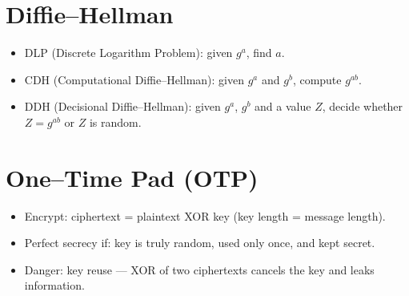 \documentclass[12pt]{article}
\begin{document}
\section{Diffie--Hellman}
\begin{itemize}
  \item DLP (Discrete Logarithm Problem): given $g^a$, find $a$.
  \item CDH (Computational Diffie--Hellman): given $g^a$ and $g^b$, compute $g^{ab}$.
  \item DDH (Decisional Diffie--Hellman): given $g^a$, $g^b$ and a value $Z$, decide whether $Z=g^{ab}$ or $Z$ is random.
\end{itemize}

\hrulefill

\section{One--Time Pad (OTP)}
\begin{itemize}
  \item Encrypt: ciphertext = plaintext XOR key (key length = message length).
  \item Perfect secrecy if: key is truly random, used only once, and kept secret.
  \item Danger: key reuse --- XOR of two ciphertexts cancels the key and leaks information.
\end{itemize}

\hrulefill
\end{document}
